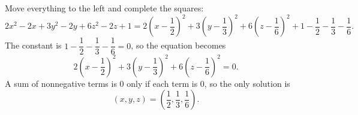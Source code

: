 Move everything to the left and complete the squares:
\[2x^2-2x+3y^2-2y+6z^2-2z+1=2\left(x-\dfrac{1}{2}\right)^2+3\left(y-\dfrac{1}{3}\right)^2+6\left(z-\dfrac{1}{6}\right)^2+1-\dfrac{1}{2}-\dfrac{1}{3}-\dfrac{1}{6}.\]
The constant is $1-\dfrac{1}{2}-\dfrac{1}{3}-\dfrac{1}{6}=0$, so the equation becomes
\[2\left(x-\dfrac{1}{2}\right)^2+3\left(y-\dfrac{1}{3}\right)^2+6\left(z-\dfrac{1}{6}\right)^2=0.\]
A sum of nonnegative terms is $0$ only if each term is $0$, so the only solution is
\[(x,y,z)=\boxed{\left(\dfrac{1}{2},\dfrac{1}{3},\dfrac{1}{6}\right)}.\]
